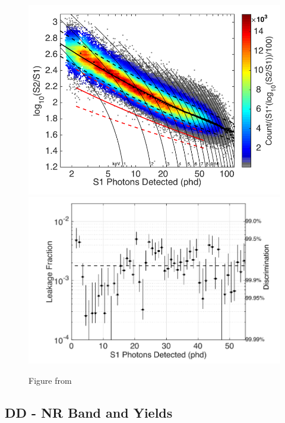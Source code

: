 \begin{figure}[htbp]
\begin{center}
\includegraphics[width=\halffig]{figures/lux/lux_tritium2a.png}
\includegraphics[width=\halffig]{figures/lux/lux_tritium2b.png}
\caption{ Figure from \cite{LUXTritium}}
\label{fig:tritium1}
\end{center}
\end{figure}


\subsection{DD - NR Band and Yields}







